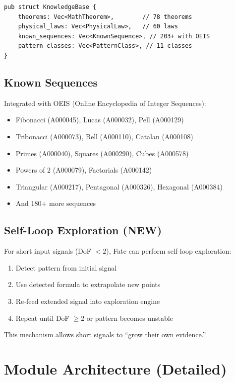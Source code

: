 \documentclass[11pt,a4paper]{article}
\begin{document}
\begin{verbatim}
pub struct KnowledgeBase {
    theorems: Vec<MathTheorem>,        // 78 theorems
    physical_laws: Vec<PhysicalLaw>,   // 60 laws
    known_sequences: Vec<KnownSequence>, // 203+ with OEIS
    pattern_classes: Vec<PatternClass>, // 11 classes
}
\end{verbatim}

\subsection{Known Sequences}

Integrated with OEIS (Online Encyclopedia of Integer Sequences):
\begin{itemize}
    \item Fibonacci (A000045), Lucas (A000032), Pell (A000129)
    \item Tribonacci (A000073), Bell (A000110), Catalan (A000108)
    \item Primes (A000040), Squares (A000290), Cubes (A000578)
    \item Powers of 2 (A000079), Factorials (A000142)
    \item Triangular (A000217), Pentagonal (A000326), Hexagonal (A000384)
    \item And 180+ more sequences
\end{itemize}

\subsection{Self-Loop Exploration (NEW)}

For short input signals (DoF $< 2$), Fate can perform self-loop exploration:
\begin{enumerate}
    \item Detect pattern from initial signal
    \item Use detected formula to extrapolate new points
    \item Re-feed extended signal into exploration engine
    \item Repeat until DoF $\geq 2$ or pattern becomes unstable
\end{enumerate}

This mechanism allows short signals to ``grow their own evidence.''

\section{Module Architecture (Detailed)}
\end{document}
